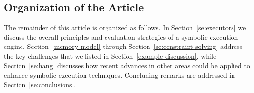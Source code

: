\subsection{Organization of the Article}
\label{ss:article-organization}


The remainder of this article is organized as follows. In Section~\ref{se:executors} we discuss the overall principles and evaluation strategies of a symbolic execution engine. Section~\ref{memory-model} through Section~\ref{se:constraint-solving} address the key challenges that we listed in Section~\ref{example-discussion}, while Section~\ref{se:hang} discusses how recent advances in other areas could be applied to enhance symbolic execution techniques. Concluding remarks are addressed in Section~\ref{se:conclusions}. %




